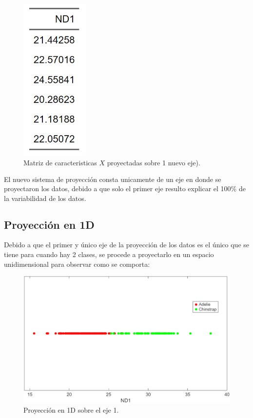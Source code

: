 \documentclass[11pt, letterpaper]{article}
\begin{document}
\begin{figure}[h!]
	\centering
	\begin{minipage}{0.8\textwidth}
		\centering
		\includegraphics[width=0.3\textwidth]{IMG/T2.png}
		\caption{Matriz de caracteristicas $X$ proyectadas sobre 1 nuevo eje).}
		\label{fig:f4}
	\end{minipage}\hfill
\end{figure}

El nuevo sistema de proyección consta unicamente de un eje en donde se proyectaron los datos, debido a que solo el primer eje resulto explicar el 100\% de la variabilidad de los datos.

\newpage

\subsection{Proyección en 1D}

Debido a que el primer y único eje de la proyección de los datos es el único que se tiene para cuando hay 2 clases, se procede a proyectarlo en un espacio unidimensional para observar como se comporta:

\begin{figure}[h!]
	\centering
	\begin{minipage}{1.1\textwidth}
		\centering
		\includegraphics[width=\textwidth]{IMG/G3.png}
		\caption{Proyección en 1D sobre el eje 1.}
		\label{fig:f5}
	\end{minipage}\hfill
\end{figure}
\end{document}
